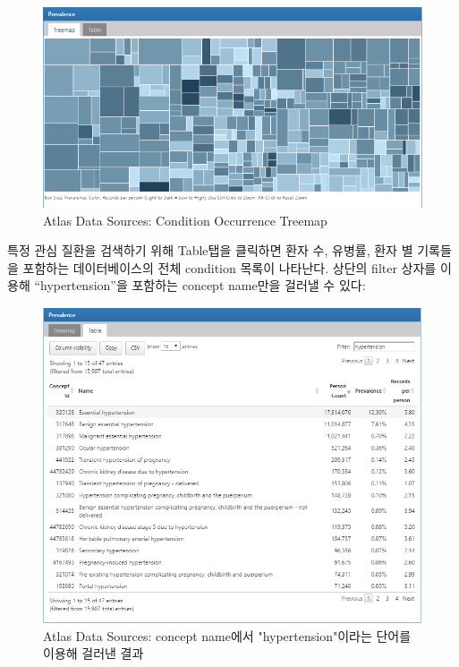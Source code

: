 \documentclass[11pt]{book}
\theoremstyle{definition}
\theoremstyle{definition}
\theoremstyle{definition}
\theoremstyle{remark}
\begin{document}
\begin{figure}

{\centering \includegraphics[width=1\linewidth]{images/Characterization/atlasDataSourcesConditionTreemap} 

}

\caption{Atlas Data Sources: Condition Occurrence Treemap}\label{fig:atlasDataSourcesConditionTreemap}
\end{figure}

특정 관심 질환을 검색하기 위해 Table탭을 클릭하면 환자 수, 유병률, 환자
별 기록들을 포함하는 데이터베이스의 전체 condition 목록이 나타난다.
상단의 filter 상자를 이용해 ``hypertension''을 포함하는 concept name만을
걸러낼 수 있다:

\begin{figure}

{\centering \includegraphics[width=1\linewidth]{images/Characterization/atlasDataSourcesConditionFiltered} 

}

\caption{Atlas Data Sources: concept name에서 "hypertension"이라는 단어를 이용해 걸러낸 결과}\label{fig:atlasDataSourcesConditionFiltered}
\end{figure}
\end{document}
